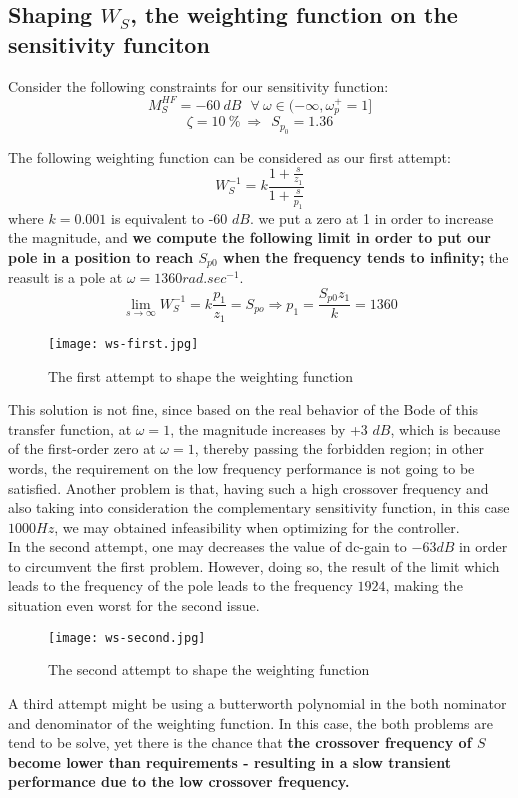 \subsection{Shaping $W_S$, the weighting function on the sensitivity funciton}
Consider the following constraints for our sensitivity function:
\[
M_S^{HF} = -60 \:dB \:\:\: \forall \:\omega \in (-\infty, \omega_p^{+}=1]
\]
\[
\zeta = 10 \:\% \: \Rightarrow \:\: S_{p_0} = 1.36
\]

The following weighting function can be considered as our first attempt:
\[
W_S^{-1} = k \frac{1 + \frac{s}{z_1}}{1 + \frac{s}{p_1}}
\]
where $ k = 0.001$ is equivalent to -60 $dB$. we put a zero at 1 in order to increase the magnitude, and \textbf{we compute the following limit in order to put our pole in a position to reach $S_{p0}$ when the frequency tends to infinity;} the reasult is a pole at $\omega = 1360 rad.sec^{-1}$.
\[
\lim\limits_{s \to \infty} W_S^{-1} = k \frac{p_1}{z_1} = S_{po} \Rightarrow p_1 = \frac{S_{p0}z_1}{k} = 1360
\]

\begin{figure}[H]
    \centering
    \texttt{[image: ws-first.jpg]}
    \caption{The first attempt to shape the weighting function}
\end{figure}

This solution is not fine, since based on the real behavior of the Bode of this transfer function, at $\omega = 1$, the magnitude increases by +3 $dB$, which is because of the first-order zero at $\omega = 1$, thereby passing the forbidden region; in other words, the requirement on the low frequency performance is not going to be satisfied. Another problem is that, having such a high crossover frequency and also taking into consideration the complementary sensitivity function, in this case $1000 Hz$, we may obtained infeasibility when optimizing for the controller.  \\

In the second attempt, one may decreases the value of dc-gain to $-63 dB$ in order to circumvent the first problem. However, doing so, the result of the limit which leads to the frequency of the pole leads to the frequency $1924$, making the situation even worst for the second issue.
\begin{figure}[H]
    \centering
    \texttt{[image: ws-second.jpg]}
    \caption{The second attempt to shape the weighting function}
\end{figure}


A third attempt might be using a butterworth polynomial in the both nominator and denominator of the weighting function. In this case, the both problems are tend to be solve, yet there is the chance that \textbf{the crossover frequency of $S$ become lower than requirements -  resulting in a slow transient performance due to the low crossover frequency.}\\

